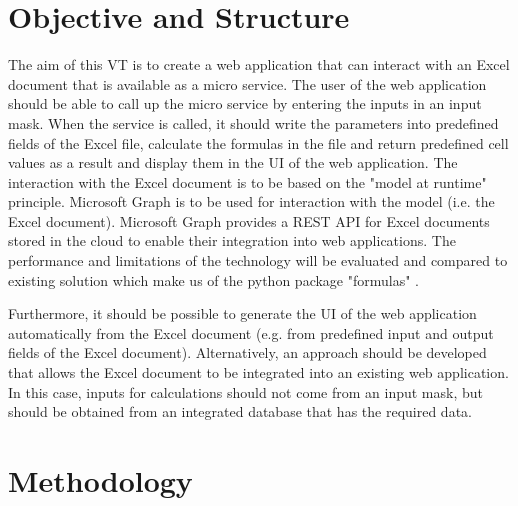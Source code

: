 \section{Objective and Structure}

The aim of this VT is to create a web application that can interact with an Excel document that is available as a micro service. The user of the web application should be able to call up the micro service by entering the inputs in an input mask. When the service is called, it should write the parameters into predefined fields of the Excel file, calculate the formulas in the file and return predefined cell values as a result and display them in the UI of the web application. 
The interaction with the Excel document is to be based on the "model at runtime" principle. Microsoft Graph is to be used for interaction with the model (i.e. the Excel document). Microsoft Graph provides a REST API for Excel documents stored in the cloud to enable their integration into web applications. The performance and limitations of the technology will be evaluated and compared  to existing solution which make us of the python package "formulas" \cite{BBA}.

Furthermore, it should be possible to generate the UI of the web application automatically from the Excel document (e.g. from predefined input and output fields of the Excel document). Alternatively, an approach should be developed that allows the Excel document to be integrated into an existing web application. In this case, inputs for calculations should not come from an input mask, but should be obtained from an integrated database that has the required data.



\section{Methodology}

